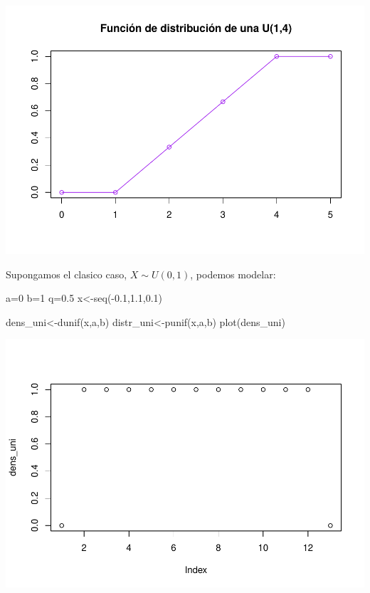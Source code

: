 \documentclass[
]{article}
\newenvironment{Shaded}{\begin{snugshade}}{\end{snugshade}}
\newcommand{\DecValTok}[1]{\textcolor[rgb]{0.00,0.00,0.81}{#1}}
\newcommand{\FloatTok}[1]{\textcolor[rgb]{0.00,0.00,0.81}{#1}}
\newcommand{\FunctionTok}[1]{\textcolor[rgb]{0.00,0.00,0.00}{#1}}
\newcommand{\NormalTok}[1]{#1}
\newcommand{\OtherTok}[1]{\textcolor[rgb]{0.56,0.35,0.01}{#1}}
\newcommand{\SpecialCharTok}[1]{\textcolor[rgb]{0.00,0.00,0.00}{#1}}
\begin{document}
\includegraphics{Teoria4_files/figure-latex/Distribucion uniforme-2.pdf}

Supongamos el clasico caso, \(X\sim U(0,1)\), podemos modelar:

\begin{Shaded}
\begin{Highlighting}[]
\NormalTok{a}\OtherTok{=}\DecValTok{0}
\NormalTok{b}\OtherTok{=}\DecValTok{1}
\NormalTok{q}\OtherTok{=}\FloatTok{0.5}
\NormalTok{x}\OtherTok{\textless{}{-}}\FunctionTok{seq}\NormalTok{(}\SpecialCharTok{{-}}\FloatTok{0.1}\NormalTok{,}\FloatTok{1.1}\NormalTok{,}\FloatTok{0.1}\NormalTok{)}

\NormalTok{dens\_uni}\OtherTok{\textless{}{-}}\FunctionTok{dunif}\NormalTok{(x,a,b)}
\NormalTok{distr\_uni}\OtherTok{\textless{}{-}}\FunctionTok{punif}\NormalTok{(x,a,b)}
\FunctionTok{plot}\NormalTok{(dens\_uni)}
\end{Highlighting}
\end{Shaded}

\includegraphics{Teoria4_files/figure-latex/Ejemplo distribucion uniforme-1.pdf}
\end{document}
